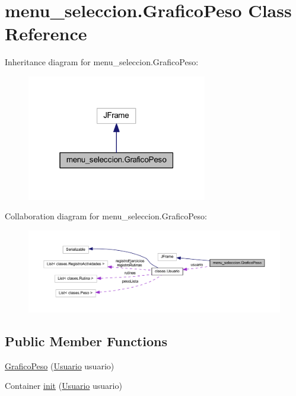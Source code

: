 \hypertarget{classmenu__seleccion_1_1_grafico_peso}{}\section{menu\+\_\+seleccion.\+Grafico\+Peso Class Reference}
\label{classmenu__seleccion_1_1_grafico_peso}


Inheritance diagram for menu\+\_\+seleccion.\+Grafico\+Peso\+:
\nopagebreak
\begin{figure}[H]
\begin{center}
\leavevmode
\includegraphics[width=223pt]{classmenu__seleccion_1_1_grafico_peso__inherit__graph}
\end{center}
\end{figure}


Collaboration diagram for menu\+\_\+seleccion.\+Grafico\+Peso\+:
\nopagebreak
\begin{figure}[H]
\begin{center}
\leavevmode
\includegraphics[width=350pt]{classmenu__seleccion_1_1_grafico_peso__coll__graph}
\end{center}
\end{figure}
\subsection*{Public Member Functions}
\begin{DoxyCompactItemize}
\item 
\mbox{\hyperlink{classmenu__seleccion_1_1_grafico_peso_a099eb455c9f0271c11c8467331c71d29}{Grafico\+Peso}} (\mbox{\hyperlink{classclases_1_1_usuario}{Usuario}} usuario)
\item 
Container \mbox{\hyperlink{classmenu__seleccion_1_1_grafico_peso_a4f2890aa8adb5aec8648b0efd8aef145}{init}} (\mbox{\hyperlink{classclases_1_1_usuario}{Usuario}} usuario)
\end{DoxyCompactItemize}


